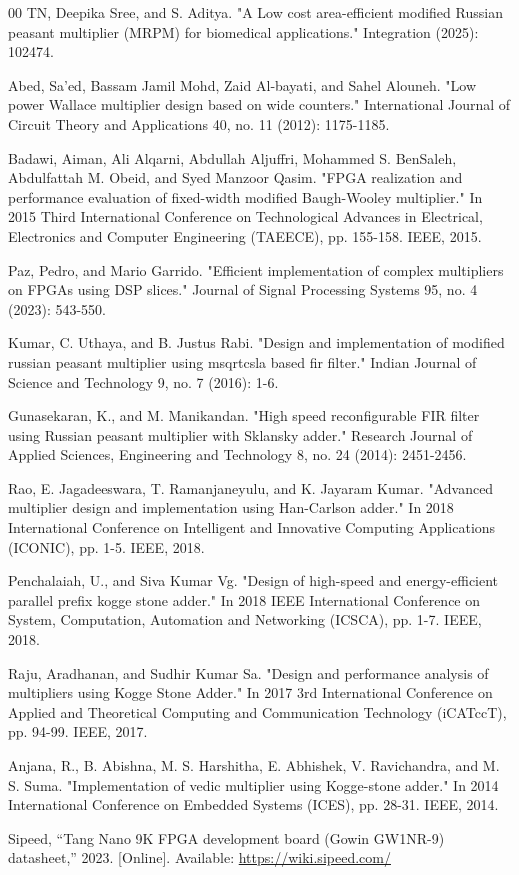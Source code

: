 \documentclass[conference]{IEEEtran}
\begin{document}
\begin{thebibliography}{00}
TN, Deepika Sree, and S. Aditya. "A Low cost area-efficient modified Russian peasant multiplier (MRPM) for biomedical applications." Integration (2025): 102474.

Abed, Sa'ed, Bassam Jamil Mohd, Zaid Al‐bayati, and Sahel Alouneh. "Low power Wallace multiplier design based on wide counters." International Journal of Circuit Theory and Applications 40, no. 11 (2012): 1175-1185.

Badawi, Aiman, Ali Alqarni, Abdullah Aljuffri, Mohammed S. BenSaleh, Abdulfattah M. Obeid, and Syed Manzoor Qasim. "FPGA realization and performance evaluation of fixed-width modified Baugh-Wooley multiplier." In 2015 Third International Conference on Technological Advances in Electrical, Electronics and Computer Engineering (TAEECE), pp. 155-158. IEEE, 2015.

Paz, Pedro, and Mario Garrido. "Efficient implementation of complex multipliers on FPGAs using DSP slices." Journal of Signal Processing Systems 95, no. 4 (2023): 543-550.

Kumar, C. Uthaya, and B. Justus Rabi. "Design and implementation of modified russian peasant multiplier using msqrtcsla based fir filter." Indian Journal of Science and Technology 9, no. 7 (2016): 1-6.

Gunasekaran, K., and M. Manikandan. "High speed reconfigurable FIR filter using Russian peasant multiplier with Sklansky adder." Research Journal of Applied Sciences, Engineering and Technology 8, no. 24 (2014): 2451-2456.

Rao, E. Jagadeeswara, T. Ramanjaneyulu, and K. Jayaram Kumar. "Advanced multiplier design and implementation using Han-Carlson adder." In 2018 International Conference on Intelligent and Innovative Computing Applications (ICONIC), pp. 1-5. IEEE, 2018.

Penchalaiah, U., and Siva Kumar Vg. "Design of high-speed and energy-efficient parallel prefix kogge stone adder." In 2018 IEEE International Conference on System, Computation, Automation and Networking (ICSCA), pp. 1-7. IEEE, 2018.

Raju, Aradhanan, and Sudhir Kumar Sa. "Design and performance analysis of multipliers using Kogge Stone Adder." In 2017 3rd International Conference on Applied and Theoretical Computing and Communication Technology (iCATccT), pp. 94-99. IEEE, 2017.

Anjana, R., B. Abishna, M. S. Harshitha, E. Abhishek, V. Ravichandra, and M. S. Suma. "Implementation of vedic multiplier using Kogge-stone adder." In 2014 International Conference on Embedded Systems (ICES), pp. 28-31. IEEE, 2014.

Sipeed, ``Tang Nano 9K FPGA development board (Gowin GW1NR-9)
datasheet,'' 2023. [Online]. Available: \url{https://wiki.sipeed.com/}

\end{thebibliography}
\end{document}
